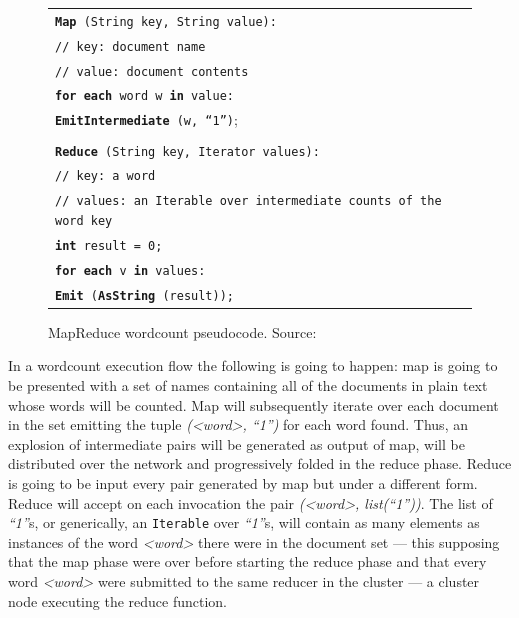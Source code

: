 \begin{figure}[tbp]
 \begin{center}
  \begin{tabular}{|l|}
   \hline
   \texttt{{\bf Map} (String key, String value):} \\
   \texttt{// key: document name} \\
   \texttt{// value: document contents} \\
   \texttt{{\bf for each} word w {\bf in} value:} \\
   \texttt{{\bf EmitIntermediate} (w, ``1'')};\\ \\

   \texttt{{\bf Reduce} (String key, Iterator values):} \\
   \texttt{// key: a word} \\
   \texttt{// values: an Iterable over intermediate counts of the word key} \\
   \texttt{{\bf int} result = 0;} \\
   \texttt{{\bf for each} v {\bf in} values:} \\
   \texttt{{\bf Emit} ({\bf AsString} (result));} \\
   \hline
  \end{tabular}
  \caption{MapReduce wordcount pseudocode. Source: \cite{googlemapreduce}}
  \label{fig:wordcount}
 \end{center}
\end{figure}

In a wordcount execution flow the following is going to happen: map is going to be presented with a set of names containing all of the documents in plain text whose words will be counted. Map will subsequently iterate over each document in the set emitting the tuple \emph{(<word>, ``1'')} for each word found. Thus, an explosion of intermediate pairs will be generated as output of map, will be distributed over the network and progressively folded in the reduce phase. Reduce is going to be input every pair generated by map but under a different form. Reduce will accept on each invocation the pair \emph{(<word>, list(``1''))}. The list of \emph{``1''}s, or generically, an \texttt{Iterable} over \emph{``1''}s, will contain as many elements as instances of the word \emph{<word>} there were in the document set --- this supposing that the map phase were over before starting the reduce phase and that every word \emph{<word>} were submitted to the same reducer in the cluster --- a cluster node executing the reduce function.

